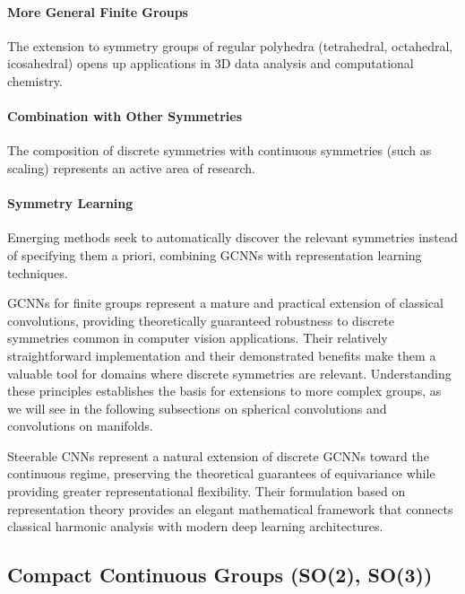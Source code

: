 \paragraph{More General Finite Groups}

The extension to symmetry groups of regular polyhedra (tetrahedral, octahedral, icosahedral) opens up applications in 3D data analysis and computational chemistry.

\paragraph{Combination with Other Symmetries}

The composition of discrete symmetries with continuous symmetries (such as scaling) represents an active area of research.

\paragraph{Symmetry Learning}

Emerging methods seek to automatically discover the relevant symmetries instead of specifying them a priori, combining \glspl{GCNN} with representation learning techniques.

\glspl{GCNN} for finite groups represent a mature and practical extension of classical convolutions, providing theoretically guaranteed robustness to discrete symmetries common in computer vision applications. Their relatively straightforward implementation and their demonstrated benefits make them a valuable tool for domains where discrete symmetries are relevant. Understanding these principles establishes the basis for extensions to more complex groups, as we will see in the following subsections on spherical convolutions and convolutions on manifolds.


Steerable \glspl{CNN} represent a natural extension of discrete \glspl{GCNN} toward the continuous regime, preserving the theoretical guarantees of equivariance while providing greater representational flexibility. Their formulation based on representation theory provides an elegant mathematical framework that connects classical harmonic analysis with modern deep learning architectures.

\subsection{Compact Continuous Groups (SO(2), SO(3))}\label{subsec:grupos_continuos_compactos}

